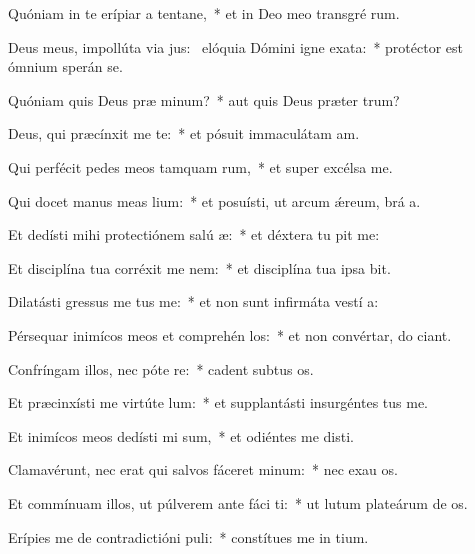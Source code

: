 \item Quóniam in te erípiar a tentane,~* et in Deo meo transgré rum.
\item Deus meus, impollúta via jus:~\pscross{} elóquia Dómini igne exata:~* protéctor est ómnium sperán  se.
\item Quóniam quis Deus præ minum?~* aut quis Deus præter  trum?
\item Deus, qui præcínxit me te:~* et pósuit immaculátam  am.
\item Qui perfécit pedes meos tamquam rum,~* et super excélsa  me.
\item Qui docet manus meas  lium:~* et posuísti, ut arcum ǽreum, brá a.
\item Et dedísti mihi protectiónem salú æ:~* et déxtera tu pit me:
\item Et disciplína tua corréxit me  nem:~* et disciplína tua ipsa  bit.
\item Dilatásti gressus me tus me:~* et non sunt infirmáta vestí a:
\item Pérsequar inimícos meos et comprehén los:~* et non convértar, do ciant.
\item Confríngam illos, nec póte re:~* cadent subtus  os.
\item Et præcinxísti me virtúte  lum:~* et supplantásti insurgéntes   tus me.
\item Et inimícos meos dedísti mi sum,~* et odiéntes me disti.
\item Clamavérunt, nec erat qui salvos fáceret  minum:~* nec exau os.
\item Et commínuam illos, ut púlverem ante fáci ti:~* ut lutum plateárum de os.
\item Erípies me de contradictióni puli:~* constítues me in  tium.
